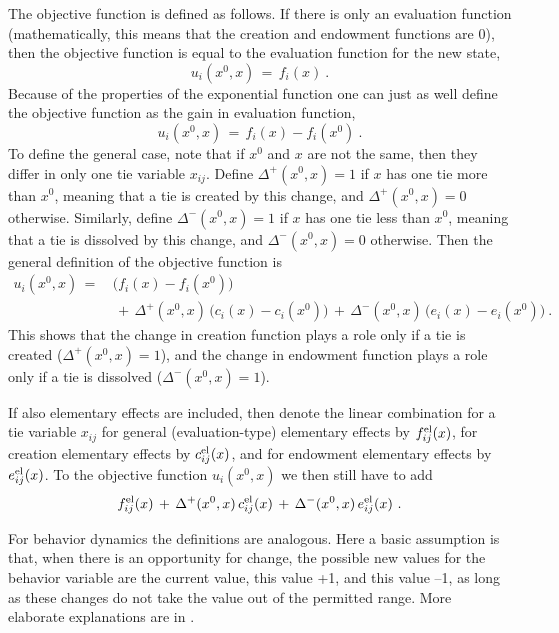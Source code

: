 \documentclass[a4paper,fleqn,11pt]{article}
\newcommand{\+}{\, + \,}
\begin{document}
The objective function is defined as follows.
If there is only an evaluation function (mathematically, this means that
the creation and endowment functions are 0), then
the objective function is equal to the evaluation function for the new state,
\[
   u_i(x^0, x) \,=\, f_i(x) \ .
\]
Because of the properties of the exponential function one can just as
well define the objective function as the gain in evaluation function,
\begin{equation}
   u_i(x^0, x) \,=\, f_i(x) - f_i(x^0) \ .    \label{gain}
\end{equation}
To define the general case, note that if $x^0$ and $x$ are not the same,
then they differ in only one tie variable $x_{ij}$.
Define  $\Delta^+(x^0, x) = 1$ if $x$ has one tie more than $x^0$,
meaning that a tie is created by this change, and $\Delta^+(x^0, x) = 0$
otherwise.
Similarly, define  $\Delta^-(x^0, x) = 1$ if $x$ has one tie less than $x^0$,
meaning that a tie is dissolved by this change, and $\Delta^-(x^0, x) = 0$
otherwise.
Then the general definition of the objective function is
\begin{align}
   u_i(x^0, x)  \,=\,  \label{u_i}   &
      \big(f_i(x) -  f_i(x^0)\big)  \\
                &   \,+\,   \Delta^+(x^0, x)\,\big(c_i(x) - c_i(x^0)\big)
                   \,+\,  \Delta^-(x^0, x)\,\big(e_i(x) - e_i(x^0)\big)    \ . \nonumber
\end{align}
This shows that the change in creation function plays a role
only if a tie is created ($\Delta^+(x^0,x) = 1$), and the change in
endowment function plays a role
only if a tie is dissolved ($\Delta^-(x^0,x) = 1$).

If also elementary effects are included, then denote the linear combination
for a tie variable $x_{ij}$
for general (evaluation-type) elementary effects by  $f^{\rm{el}}_{ij}(x)$, for creation
elementary effects by  $c^{\rm{el}}_{ij}(x)$, and for endowment elementary effects
by  $e^{\rm{el}}_{ij}(x)$.
To the objective function $ u_i(x^0, x)$ we then still have to add
\[
     f^{\rm{el}}_{ij}(x) \,+\,   \Delta^+(x^0, x)\, c^{\rm{el}}_{ij}(x)
                   \,+\,  \Delta^-(x^0, x)\,e^{\rm{el}}_{ij}(x) \ .
\]

For behavior dynamics the definitions are analogous.
Here a basic assumption is that, when there is an opportunity for change,
the possible new values for the behavior variable are the current
value, this value +1, and this value --1, as long as these changes
do not take the value out of the permitted range.
More elaborate explanations are in
\citep*{SnijdersEA07, SnijdersEA10b, SteglichEA10, VeenstraEtAl2013}.
\end{document}
